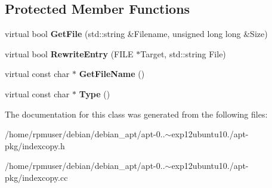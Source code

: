 \subsection*{\-Protected \-Member \-Functions}
\begin{DoxyCompactItemize}
\item 
virtual bool {\bfseries \-Get\-File} (std\-::string \&\-Filename, unsigned long long \&\-Size)\label{classPackageCopy_a6e537ba3dcb7ca8854dee7e9bead5c5e}

\item 
virtual bool {\bfseries \-Rewrite\-Entry} (\-F\-I\-L\-E $\ast$\-Target, std\-::string \-File)\label{classPackageCopy_a56581cf4bf4b32530c6fdeacb6051a65}

\item 
virtual const char $\ast$ {\bfseries \-Get\-File\-Name} ()\label{classPackageCopy_a30310e33e458ab5a340cca45aa4211cd}

\item 
virtual const char $\ast$ {\bfseries \-Type} ()\label{classPackageCopy_a6472491bac6385804dd5e43a29ef7714}

\end{DoxyCompactItemize}


\-The documentation for this class was generated from the following files\-:\begin{DoxyCompactItemize}
\item 
/home/rpmuser/debian/debian\-\_\-apt/apt-\/0..$\sim$exp12ubuntu10./apt-\/pkg/indexcopy.\-h\item 
/home/rpmuser/debian/debian\-\_\-apt/apt-\/0..$\sim$exp12ubuntu10./apt-\/pkg/indexcopy.\-cc\end{DoxyCompactItemize}
